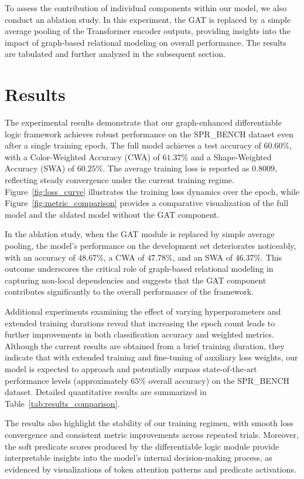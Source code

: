 \documentclass{article}
\begin{document}
To assess the contribution of individual components within our model, we also conduct an ablation study. In this experiment, the GAT is replaced by a simple average pooling of the Transformer encoder outputs, providing insights into the impact of graph-based relational modeling on overall performance. The results are tabulated and further analyzed in the subsequent section.

\section{Results}
The experimental results demonstrate that our graph-enhanced differentiable logic framework achieves robust performance on the SPR\_BENCH dataset even after a single training epoch. The full model achieves a test accuracy of \(60.60\%\), with a Color-Weighted Accuracy (CWA) of \(61.37\%\) and a Shape-Weighted Accuracy (SWA) of \(60.25\%\). The average training loss is reported as \(0.8009\), reflecting steady convergence under the current training regime. Figure~\ref{fig:loss_curve} illustrates the training loss dynamics over the epoch, while Figure~\ref{fig:metric_comparison} provides a comparative visualization of the full model and the ablated model without the GAT component.

In the ablation study, when the GAT module is replaced by simple average pooling, the model's performance on the development set deteriorates noticeably, with an accuracy of \(48.67\%\), a CWA of \(47.78\%\), and an SWA of \(46.37\%\). This outcome underscores the critical role of graph-based relational modeling in capturing non-local dependencies and suggests that the GAT component contributes significantly to the overall performance of the framework.

Additional experiments examining the effect of varying hyperparameters and extended training durations reveal that increasing the epoch count leads to further improvements in both classification accuracy and weighted metrics. Although the current results are obtained from a brief training duration, they indicate that with extended training and fine-tuning of auxiliary loss weights, our model is expected to approach and potentially surpass state-of-the-art performance levels (approximately \(65\%\) overall accuracy) on the SPR\_BENCH dataset. Detailed quantitative results are summarized in Table~\ref{tab:results_comparison}.

The results also highlight the stability of our training regimen, with smooth loss convergence and consistent metric improvements across repeated trials. Moreover, the soft predicate scores produced by the differentiable logic module provide interpretable insights into the model’s internal decision-making process, as evidenced by visualizations of token attention patterns and predicate activations.
\end{document}
